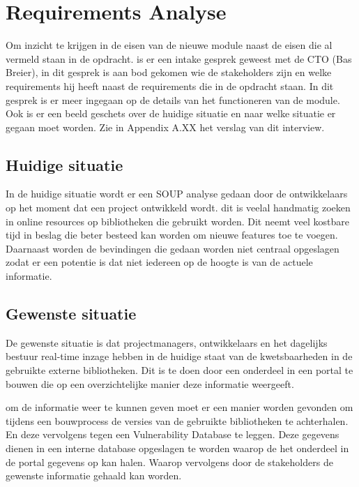 
\chapter{Requirements Analyse}\label{ch:requirements-analyse} %

\label{requirementsAnalyse} %
Om inzicht te krijgen in de eisen van de nieuwe module naast de eisen die al vermeld staan in de opdracht.
is er een intake gesprek geweest met de CTO (Bas Breier), in dit gesprek is aan bod gekomen wie de stakeholders zijn en welke requirements hij heeft naast de requirements die in de opdracht staan.
In dit gesprek is er meer ingegaan op de details van het functioneren van de module.
Ook is er een beeld geschets over de huidige situatie en naar welke situatie er gegaan moet worden. %
Zie in Appendix A.XX het verslag van dit interview.


\section{Huidige situatie}\label{sec:huidige-situatie}
In de huidige situatie wordt er een SOUP analyse gedaan door de ontwikkelaars op het moment dat een project ontwikkeld wordt.
dit is veelal handmatig zoeken in online resources op bibliotheken die gebruikt worden.
Dit neemt veel kostbare tijd in beslag die beter besteed kan worden om nieuwe features toe te voegen.
Daarnaast worden de bevindingen die gedaan worden niet centraal opgeslagen zodat er een potentie is dat niet iedereen op de hoogte is van de actuele informatie.

\section{Gewenste situatie}\label{sec:gewenste-situatie}
De gewenste situatie is dat projectmanagers, ontwikkelaars en het dagelijks bestuur real-time inzage hebben in de huidige staat van de kwetsbaarheden in de gebruikte externe bibliotheken.
Dit is te doen door een onderdeel in een portal te bouwen die op een overzichtelijke manier deze informatie weergeeft.

om de informatie weer te kunnen geven moet er een manier worden gevonden om tijdens een bouwprocess de versies van de gebruikte bibliotheken te achterhalen.
En deze vervolgens tegen een Vulnerability Database te leggen.
Deze gegevens dienen in een interne database opgeslagen te worden waarop de het onderdeel in de portal gegevens op kan halen.
Waarop vervolgens door de stakeholders de gewenste informatie gehaald kan worden.

